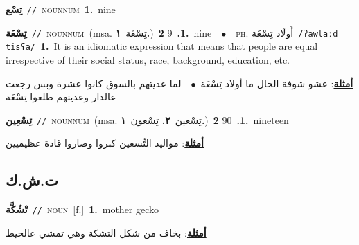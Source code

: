 \documentclass[10pt,a4paper,twoside]{article} %
\begin{document}
\begin{multicols}{2}
{{{{{{{{{{{\setlength\topsep{0pt}\textbf{\foreignlanguage{arabic}{تِسْع}}\ {\color{gray}\texttt{//}\color{black}}\ \textsc{noun\textunderscore num}\ \textbf{1.}~nine\ 

{\setlength\topsep{0pt}\textbf{\foreignlanguage{arabic}{تِسْعَة}}\ {\color{gray}\texttt{//}\color{black}}\ \textsc{noun\textunderscore num}\ \color{gray}(msa. \foreignlanguage{arabic}{تِسْعَة}~\foreignlanguage{arabic}{\textbf{١.}})\color{black}\ \textbf{1.}~9  \textbf{2.}~nine\ \ $\bullet$\ \ \textsc{ph.} \color{gray} \foreignlanguage{arabic}{أَولَاد تِسْعَة}\color{black}\ {\color{gray}\texttt{/{\sffamily ʔawlaːd tisʕa}/}\color{black}}\ \textbf{1.}~It is an idiomatic expression that means that people are equal irrespective of their social status, race, background, education, etc.\  \begin{flushright}\color{gray}\foreignlanguage{arabic}{\textbf{\underline{\foreignlanguage{arabic}{أمثلة}}}: عشو شوفة الحال ما أولاد تِسْعَة\ $\bullet$\ \  لما عديتهم بالسوق كانوا عشرة وبس رجعت عالدار وعديتهم طلعوا تِسْعَة}\end{flushright}\color{black}} \vspace{2mm}

{\setlength\topsep{0pt}\textbf{\foreignlanguage{arabic}{تِسْعِين}}\ {\color{gray}\texttt{//}\color{black}}\ \textsc{noun\textunderscore num}\ \color{gray}(msa. \foreignlanguage{arabic}{تِسْعين}~\foreignlanguage{arabic}{\textbf{٢.}}  \foreignlanguage{arabic}{تِسْعون}~\foreignlanguage{arabic}{\textbf{١.}})\color{black}\ \textbf{1.}~90  \textbf{2.}~nineteen\  \begin{flushright}\color{gray}\foreignlanguage{arabic}{\textbf{\underline{\foreignlanguage{arabic}{أمثلة}}}: مواليد التِّسعين كبروا وصاروا قادة عظيميين}\end{flushright}\color{black}} \vspace{2mm}

\vspace{-3mm}
\subsection*{\color{blue}\foreignlanguage{arabic}{ت.ش.ك}\color{blue}{ (ntws)}} 

{\setlength\topsep{0pt}\textbf{\foreignlanguage{arabic}{تْشُكَّة}}\ {\color{gray}\texttt{//}\color{black}}\ \textsc{noun}\ [f.]\ \textbf{1.}~mother gecko\  \begin{flushright}\color{gray}\foreignlanguage{arabic}{\textbf{\underline{\foreignlanguage{arabic}{أمثلة}}}: بخاف من شكل التشكة وهي تمشي عالحيط}\end{flushright}\color{black}} \vspace{2mm}

}}}}}}}}}}}
\end{multicols}
\end{document}
